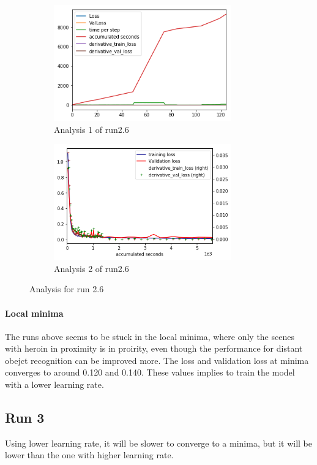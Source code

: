 \documentclass[paper=a4, fontsize=11pt]{scrartcl} %
\numberwithin{equation}{section} %
\numberwithin{figure}{section} %
\numberwithin{table}{section} %
\begin{document}
\begin{figure}	
	\begin{subfigure}{0.45\textwidth}
	\includegraphics[width=0.9\linewidth, height=5cm]{./imgs/analysis_0_2_6.png} 
	\caption{Analysis 1 of run2.6}
	\label{fig:subAnalysisRun26}
	\end{subfigure}
	\begin{subfigure}{0.45\textwidth}
	\includegraphics[width=0.9\linewidth, height=5cm]{./imgs/analysis_0_2_6plot.png}
	\caption{Analysis 2 of run2.6}
	\label{fig:subAnalysisRun26plot}
	\end{subfigure}
	 
	\caption{Analysis for run 2.6}
	\label{fig:AnalysisRun26}
 \end{figure}
 
\paragraph{Local minima}
The runs above seems to be stuck in the local minima, where only the scenes with heroin in proximity is in proirity, even though the performance for distant obejct recognition can be improved more. The loss and validation loss at minima converges to around 0.120 and 0.140. These values implies to train the model with a lower learning rate.

\subsection{Run 3}
Using lower learning rate, it will be slower to converge to a minima, but it will be lower than the one with higher learning rate.
\end{document}
